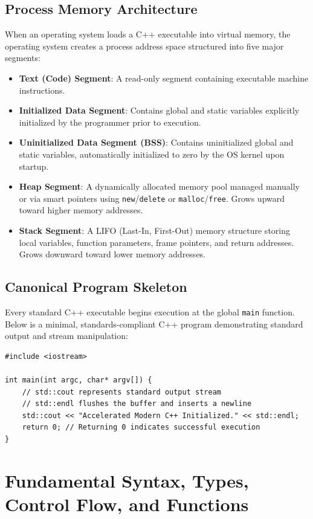 \documentclass[10pt,journal,compsoc,onecolumn]{IEEEtran}
\begin{document}
\subsection{Process Memory Architecture}
When an operating system loads a C++ executable into virtual memory, the operating system creates a process address space structured into five major segments:

\begin{itemize}
    \item \textbf{Text (Code) Segment}: A read-only segment containing executable machine instructions.
    \item \textbf{Initialized Data Segment}: Contains global and static variables explicitly initialized by the programmer prior to execution.
    \item \textbf{Uninitialized Data Segment (BSS)}: Contains uninitialized global and static variables, automatically initialized to zero by the OS kernel upon startup.
    \item \textbf{Heap Segment}: A dynamically allocated memory pool managed manually or via smart pointers using \texttt{new}/\texttt{delete} or \texttt{malloc}/\texttt{free}. Grows upward toward higher memory addresses.
    \item \textbf{Stack Segment}: A LIFO (Last-In, First-Out) memory structure storing local variables, function parameters, frame pointers, and return addresses. Grows downward toward lower memory addresses.
\end{itemize}

\subsection{Canonical Program Skeleton}
Every standard C++ executable begins execution at the global \texttt{main} function. Below is a minimal, standards-compliant C++ program demonstrating standard output and stream manipulation:

\begin{verbatim}
#include <iostream>

int main(int argc, char* argv[]) {
    // std::cout represents standard output stream
    // std::endl flushes the buffer and inserts a newline
    std::cout << "Accelerated Modern C++ Initialized." << std::endl;
    return 0; // Returning 0 indicates successful execution
}
\end{verbatim}

\section{Fundamental Syntax, Types, Control Flow, and Functions}
\label{sec:syntax}
\end{document}
